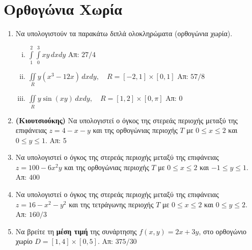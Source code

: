 \documentclass[a4paper,table]{report}
\begin{document}
\begin{center}
  \minibox{\large\bf \textcolor{Col1}{Ασκήσεις Διπλό Ολοκλήρωμα}}
\end{center}


\section*{Ορθογώνια Χωρία}

\begin{enumerate}
  \item Να υπολογιστούν τα παρακάτω διπλά ολοκληρώματα (ορθογώνια χωρία).
    \begin{enumerate}[i)]
      \item $\int\limits_1^2\!\!\!\int\limits_0^ 3xy\,dxdy$ 
        \hfill Απ: ${27}/{4}$ %
      \item $\iint\limits_{R}y(x^3-12x)\,dxdy,\quad R=[-2,1]\times[0,1]$ 
        \hfill Απ: ${57}/{8}$
      \item $ \iint\limits_{R}y\sin(xy)\,dxdy, \quad R=[1,2]\times[0,\pi] $ 
        \hfill Απ: $ 0 $ 
    \end{enumerate}

  \item \textbf{(Κιουτσιούκης)} Να υπολογιστεί ο όγκος της στερεάς περιοχής μεταξύ 
    της επιφάνειας $ z=4-x-y $ και της ορθογώνιας περιοχής $T$ με $ 0 \leq x \leq 2 $ 
    και $ 0 \leq y \leq 1 $. \hfill Απ: 5  

  \item Να υπολογιστεί ο όγκος της στερεάς περιοχής μεταξύ της επιφάνειας 
    $ z = 100 - 6x^{2}y $ και της ορθογώνιας περιοχής $T$ με 
    $ 0 \leq x \leq 2 $ και $ -1 \leq y \leq 1 $. \hfill Απ: $400$ 

  \item Να υπολογιστεί ο όγκος της στερεάς περιοχής μεταξύ της 
    επιφάνειας $ z= 16-x^{2}-y^{2} $ και της τετράγωνης περιοχής $T$ με 
    $ 0 \leq x \leq 2 $ και $ 0 \leq y \leq 2 $. \hfill Απ: $160/3$ 

  \item Να βρείτε τη \textbf{μέση τιμή} της συνάρτησης $ f(x,y)=2x+3y $, στο 
    ορθογώνιο χωρίο $D= [1,4] \times [0,5]$.
    \hfill Απ: $ {375}/{30} $ 




\end{enumerate}
\end{document}
